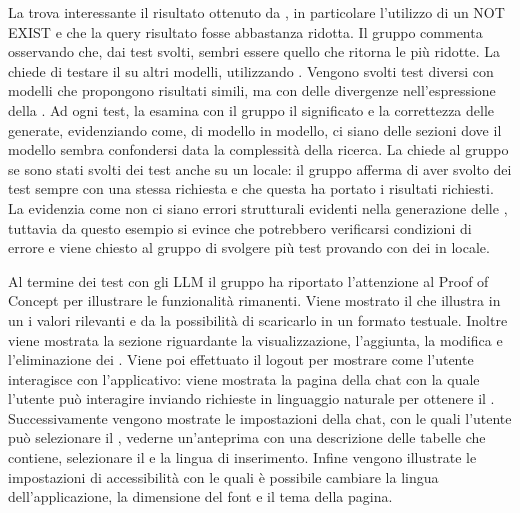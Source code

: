 \par La  trova interessante il risultato ottenuto da , in particolare l'utilizzo di un NOT EXIST e che la query risultato fosse abbastanza ridotta. Il gruppo commenta osservando che, dai test svolti,  sembri essere quello che ritorna le   più ridotte.
La  chiede di testare il  su altri modelli, utilizzando . Vengono svolti test diversi con modelli che propongono risultati simili, ma con delle divergenze nell'espressione della . Ad ogni test, la  esamina con il gruppo il significato e la correttezza delle   generate, evidenziando come, di modello in modello, ci siano delle sezioni dove il modello sembra confondersi data la complessità della ricerca.
La  chiede al gruppo se sono stati svolti dei test anche su un  locale: il gruppo afferma di aver svolto dei test sempre con una stessa richiesta e che questa ha portato i risultati richiesti.
La  evidenzia come non ci siano errori strutturali evidenti nella generazione delle , tuttavia da questo esempio si evince che potrebbero verificarsi condizioni di errore e viene chiesto al gruppo di svolgere più test provando con dei  in locale.

\par Al termine dei test con gli LLM il gruppo ha riportato l'attenzione al Proof of Concept per illustrare le funzionalità rimanenti. Viene mostrato il  che illustra in un  i valori rilevanti e da la possibilità di scaricarlo in un formato testuale. Inoltre viene mostrata la sezione riguardante la visualizzazione, l'aggiunta, la modifica e l'eliminazione dei .
Viene poi effettuato il logout per mostrare come l'utente interagisce con l'applicativo: viene mostrata la pagina della chat con la quale l'utente può interagire inviando richieste in linguaggio naturale per ottenere il . Successivamente vengono mostrate le impostazioni della chat, con le quali l'utente può selezionare il , vederne un'anteprima con una descrizione delle tabelle che contiene, selezionare il  e la lingua di inserimento.
Infine vengono illustrate le impostazioni di accessibilità con le quali è possibile cambiare la lingua dell'applicazione, la dimensione del font e il tema della pagina.

